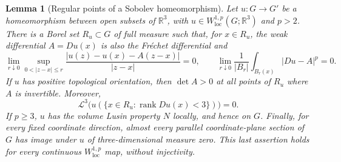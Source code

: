 \documentclass[11pt]{article}
\numberwithin{equation}{section}
\newtheorem{lemma}[theorem]{Lemma}
\theoremstyle{definition}
\theoremstyle{remark}
\begin{document}
\begin{lemma}[Regular points of a Sobolev homeomorphism]\label{hp:regularity}
Let $u:G\to G'$ be a homeomorphism between open subsets of $\mathbb R^3$,
with $u\in W^{1,p}_{\mathrm{loc}}(G;\mathbb R^3)$ and $p>2$.
There is a Borel set $R_u\subset G$ of full measure such that, for
$x\in R_u$, the weak differential $A=Du(x)$ is also the Fr\'echet
differential and
\begin{equation}\label{hp:regular-point-tests}
 \lim_{r\downarrow0}\sup_{0<|z-x|\le r}
 \frac{|u(z)-u(x)-A(z-x)|}{|z-x|}=0,
 \qquad
 \lim_{r\downarrow0}\frac{1}{|B_r|}
 \int_{B_r(x)}|Du-A|^p=0.
\end{equation}
If $u$ has positive topological orientation, then $\det A>0$ at
all points of $R_u$ where $A$ is invertible.  Moreover,
\begin{equation}\label{hp:deficient-image-null}
 \mathcal L^3\bigl(u(\{x\in R_u:\operatorname{rank} Du(x)<3\})\bigr)=0.
\end{equation}
If $p\ge3$, $u$ has the volume Lusin property $N$ locally, and hence
on $G$.  Finally, for every fixed coordinate direction, almost every
parallel coordinate-plane section of $G$ has image under $u$ of
three-dimensional measure zero.  This last assertion holds for every
continuous $W^{1,p}_{\mathrm{loc}}$ map, without injectivity.
\end{lemma}
\end{document}

